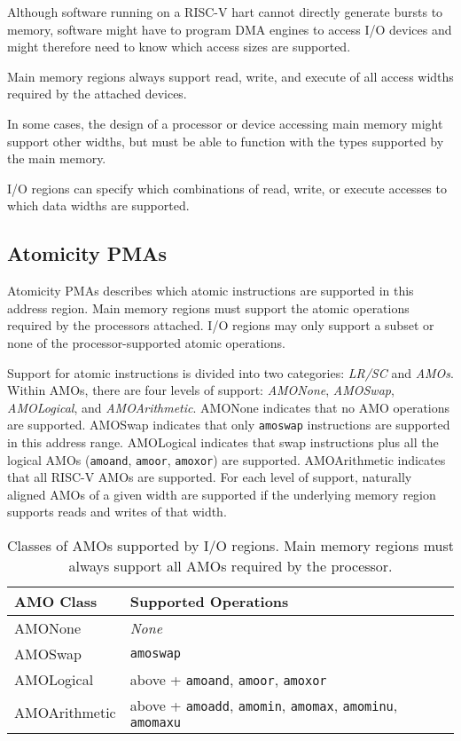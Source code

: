 \begin{commentary}
Although software running on a RISC-V hart cannot directly generate
bursts to memory, software might have to program DMA engines to access
I/O devices and might therefore need to know which access sizes are
supported.
\end{commentary}

Main memory regions always support read, write, and execute of all
access widths required by the attached devices.

\begin{commentary}
In some cases, the design of a processor or device accessing main
memory might support other widths, but must be able to function with
the types supported by the main memory.
\end{commentary}

I/O regions can specify which combinations of read, write, or execute
accesses to which data widths are supported.

\subsection{Atomicity PMAs}

Atomicity PMAs describes which atomic instructions are supported in
this address region.  Main memory regions must support the atomic
operations required by the processors attached.  I/O regions may only
support a subset or none of the processor-supported atomic operations.

Support for atomic instructions is divided into two categories: {\em
  LR/SC} and {\em AMOs}. Within AMOs, there are four levels of
support: {\em AMONone}, {\em AMOSwap}, {\em AMOLogical}, and {\em
  AMOArithmetic}.  AMONone indicates that no AMO operations are
supported.  AMOSwap indicates that only {\tt amoswap} instructions are
supported in this address range.  AMOLogical indicates that swap
instructions plus all the logical AMOs ({\tt amoand}, {\tt amoor},
{\tt amoxor}) are supported.  AMOArithmetic indicates that all RISC-V
AMOs are supported.  For each level of support, naturally aligned AMOs
of a given width are supported if the underlying memory region
supports reads and writes of that width.

\begin{table*}[h!]
\begin{center}
\begin{tabular}{|l|l|}
  \hline
  AMO Class & Supported Operations \\
  \hline
  AMONone       & {\em None} \\
  AMOSwap       & {\tt amoswap} \\
  AMOLogical    & above + {\tt amoand}, {\tt amoor}, {\tt amoxor} \\
  AMOArithmetic & above + {\tt amoadd}, {\tt amomin}, {\tt amomax}, {\tt amominu}, {\tt amomaxu} \\
  \hline
\end{tabular}
\end{center}
\caption{Classes of AMOs supported by I/O regions.  Main memory
  regions must always support all AMOs required by the processor.}
\label{amoclasses}
\end{table*}


